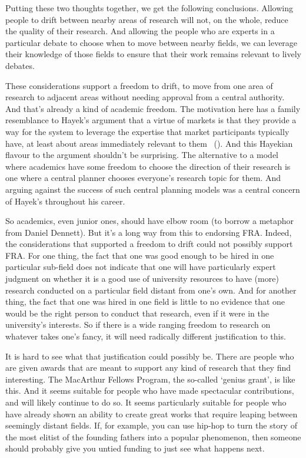 \documentclass[
  11pt,
  letterpaper,
  DIV=11,
  numbers=noendperiod]{scrartcl}
\begin{document}
Putting these two thoughts together, we get the following conclusions.
Allowing people to drift between nearby areas of research will not, on
the whole, reduce the quality of their research. And allowing the people
who are experts in a particular debate to choose when to move between
nearby fields, we can leverage their knowledge of those fields to ensure
that their work remains relevant to lively debates.

These considerations support a freedom to drift, to move from one area
of research to adjacent areas without needing approval from a central
authority. And that's already a kind of academic freedom. The motivation
here has a family resemblance to Hayek's argument that a virtue of
markets is that they provide a way for the system to leverage the
expertise that market participants typically have, at least about areas
immediately relevant to them ~().
And this Hayekian flavour to the argument shouldn't be surprising. The
alternative to a model where academics have some freedom to choose the
direction of their research is one where a central planner chooses
everyone's research topic for them. And arguing against the success of
such central planning models was a central concern of Hayek's throughout
his career.

So academics, even junior ones, should have elbow room (to borrow a
metaphor from Daniel Dennett). But it's a long way from this to
endorsing FRA. Indeed, the considerations that supported a freedom to
drift could not possibly support FRA. For one thing, the fact that one
was good enough to be hired in one particular sub-field does not
indicate that one will have particularly expert judgment on whether it
is a good use of university resources to have (more) research conducted
on a particular field distant from one's own. And for another thing, the
fact that one was hired in one field is little to no evidence that one
would be the right person to conduct that research, even if it were in
the university's interests. So if there is a wide ranging freedom to
research on whatever takes one's fancy, it will need radically different
justification to this.

It is hard to see what that justification could possibly be. There are
people who are given awards that are meant to support any kind of
research that they find interesting. The MacArthur Fellows Program, the
so-called `genius grant', is like this. And it seems suitable for people
who have made spectacular contributions, and will likely continue to do
so. It seems particularly suitable for people who have already shown an
ability to create great works that require leaping between seemingly
distant fields. If, for example, you can use hip-hop to turn the story
of the most elitist of the founding fathers into a popular phenomenon,
then someone should probably give you untied funding to just see what
happens next.
\end{document}
